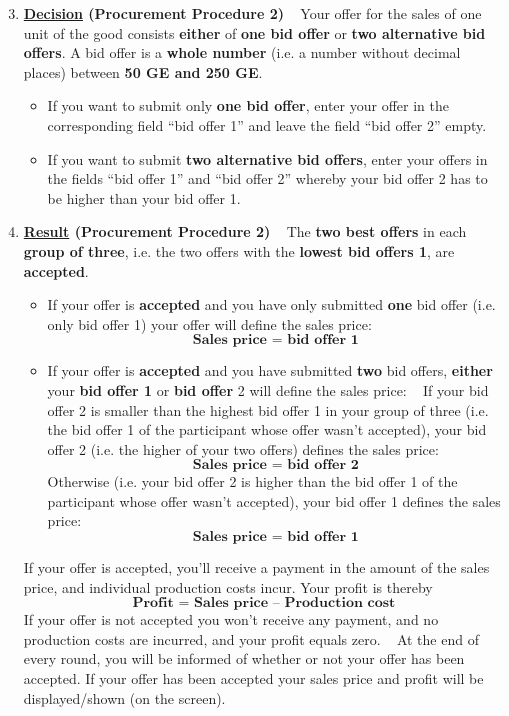 \documentclass[11pt]{article}
\begin{document}
\begin{enumerate}[label=\textbf{\upshape(\arabic*\upshape)}] \setcounter{enumi}{2}
	\item \textbf{\underline{Decision} (Procurement Procedure 2)} ~\smallbreak
		Your offer for the sales of one unit of the good consists \textbf{either} of \textbf{one bid offer} or \textbf{two alternative bid offers}. A bid offer is a \textbf{whole number} (i.e. a number without decimal places) between \textbf{50 GE and 250 GE}. 
		\begin{itemize}
			\item If you want to submit only \textbf{one bid offer}, enter your offer in the corresponding field \enquote{bid offer 1} and leave the field \enquote{bid offer 2} empty.
			\item If you want to submit \textbf{two alternative bid offers}, enter your offers in the fields \enquote{bid offer 1} and \enquote{bid offer 2} whereby your bid offer 2 has to be higher than your bid offer 1.
		\end{itemize}
	\item \textbf{\underline{Result} (Procurement Procedure 2)} ~\smallbreak
		The \textbf{two best offers} in each \textbf{group of three}, i.e. the two offers with the \textbf{lowest bid offers 1}, are \textbf{accepted}.
		\begin{itemize}
			\item If your offer is \textbf{accepted} and you have only submitted \textbf{one} bid offer (i.e. only bid offer 1) your offer will define the sales price:
			$$ \textbf{Sales price = bid offer 1} $$
			\item If your offer is \textbf{accepted} and you have submitted \textbf{two} bid offers, \textbf{either} your \textbf{bid offer 1} or \textbf{bid offer} 2 will define the sales price: ~\medbreak
			If your bid offer 2 is smaller than the highest bid offer 1 in your group of three (i.e. the bid offer 1 of the participant whose offer wasn’t accepted), your bid offer 2 (i.e. the higher of your two offers) defines the sales price:
				$$ \textbf{Sales price = bid offer 2} $$
			Otherwise (i.e. your bid offer 2 is higher than the bid offer 1 of the participant whose offer wasn’t accepted), your bid offer 1 defines the sales price:
 				$$ \textbf{Sales price = bid offer 1} $$
		\end{itemize}
		If your offer is accepted, you’ll receive a payment in the amount of the sales price, and individual production costs incur. Your profit is thereby
		$$ \textbf{Profit = Sales price – Production cost} $$
		If your offer is not accepted you won’t receive any payment, and no production costs are incurred, and your profit equals zero. ~\smallbreak
		At the end of every round, you will be informed of whether or not your offer has been accepted. If your offer has been accepted your sales price and profit will be displayed/shown (on the screen).
\end{enumerate}
\end{document}
